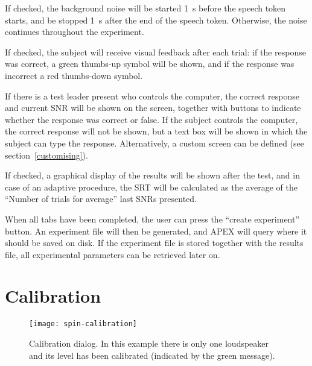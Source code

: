{\begin{description}
\itemsep1pt\parskip0pt
\item[Noise stops between trials]
If checked, the background noise will be started 1~s before the speech
token starts, and be stopped 1~s after the end of the speech token.
Otherwise, the noise continues throughout the experiment.
\item[Reinforcement]
If checked, the subject will receive visual feedback after each trial:
if the response was correct, a green thumbs-up symbol will be shown, and
if the response was incorrect a red thumbs-down symbol.
\item[Screen]
If there is a test leader present who controls the computer, the correct
response and current SNR will be shown on the screen, together with
buttons to indicate whether the response was correct or false. If the
subject controls the computer, the correct response will not be shown,
but a text box will be shown in which the subject can type the response.
Alternatively, a custom screen can be defined (see
section~\ref{customising}).
\item[Show results after test]
If checked, a graphical display of the results will be shown after the
test, and in case of an adaptive procedure, the SRT will be calculated
as the average of the ``Number of trials for average'' last SNRs
presented.
\end{description}

When all tabs have been completed, the user can press the ``create
experiment'' button. An experiment file will then be generated, and APEX
will query where it should be saved on disk. If the experiment file is stored together 
with the results file, all experimental parameters can be retrieved later on. 



\section{Calibration}
\label{sec:Calibration}

 \begin{figure} 
\texttt{[image: spin-calibration]}
\caption{Calibration dialog. In this example there is only one loudspeaker and its level has been calibrated (indicated by the green message). }
\label{fig:calibration} \end{figure} 

}
